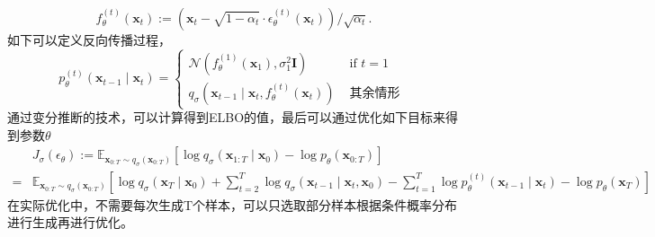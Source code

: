 \begin{equation}
f_\theta^{(t)}\left(\boldsymbol{x}_t\right):=\left(\boldsymbol{x}_t-\sqrt{1-\alpha_t} \cdot \epsilon_\theta^{(t)}\left(\boldsymbol{x}_t\right)\right) / \sqrt{\alpha_t}.
\end{equation}
如下可以定义反向传播过程，
\begin{equation}
 p_\theta^{(t)}\left(\boldsymbol{x}_{t-1} \mid \boldsymbol{x}_t\right)= \begin{cases}\mathcal{N}\left(f_\theta^{(1)}\left(\boldsymbol{x}_1\right), \sigma_1^2 \boldsymbol{I}\right) & \text { if } t=1 \\ q_\sigma\left(\boldsymbol{x}_{t-1} \mid \boldsymbol{x}_t, f_\theta^{(t)}\left(\boldsymbol{x}_t\right)\right) & \text { 其余情形 }\end{cases}   
\end{equation}
通过变分推断的技术，可以计算得到ELBO的值，最后可以通过优化如下目标来得到参数$\theta$
\begin{align} & J_\sigma\left(\epsilon_\theta\right):=\mathbb{E}_{\boldsymbol{x}_{0: T} \sim q_\sigma\left(\boldsymbol{x}_{0: T}\right)}\left[\log q_\sigma\left(\boldsymbol{x}_{1: T} \mid \boldsymbol{x}_0\right)-\log p_\theta\left(\boldsymbol{x}_{0: T}\right)\right] \\ = & \mathbb{E}_{\boldsymbol{x}_{0: T} \sim q_\sigma\left(\boldsymbol{x}_{0: T}\right)}\left[\log q_\sigma\left(\boldsymbol{x}_T \mid \boldsymbol{x}_0\right)+\sum_{t=2}^T \log q_\sigma\left(\boldsymbol{x}_{t-1} \mid \boldsymbol{x}_t, \boldsymbol{x}_0\right)-\sum_{t=1}^T \log p_\theta^{(t)}\left(\boldsymbol{x}_{t-1} \mid \boldsymbol{x}_t\right)-\log p_\theta\left(\boldsymbol{x}_T\right)\right]\end{align}
在实际优化中，不需要每次生成T个样本，可以只选取部分样本根据条件概率分布进行生成再进行优化。
